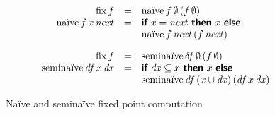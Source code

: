 \documentclass[sigplan,screen,review,timestamp]{acmart}
\begin{document}
\begin{figure}
  \[
  \begin{array}{rcl}
  \tlv{fix} \,f &=& \tlv{na\"ive} \,f \,\emptyset \,(f\, \emptyset)\\
  \tlv{na\"ive} \,f \,x \,\var{next}
  &=& \kw{if}~ x = \var{next} ~\kw{then}~ x ~\kw{else}\\
  && \tlv{na\"ive} \,f \,\var{next} \,(f \,\var{next})

  \vspace{1em}\\

  \tlv{fix} \,f &=& \tlv{semina\"ive} \,\d\!{f} \,\emptyset \,(f\, \emptyset)\\
  \tlv{semina\"ive} \,\dee f \,x \,\dee x
  &=& \kw{if}~ \dee x \subseteq x ~\kw{then}~ x ~\kw{else}\\
  && \tlv{semina\"ive} \,\dee f \,(x \cup \dee x) \,(\dee f \,x \,\dee x)

  \end{array}
  \]  
  \caption{Na\"ive and semina\"ive fixed point computation}
\end{figure}

\end{document}
